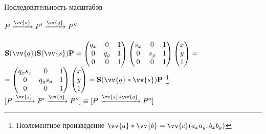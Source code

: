 \documentclass[10pt]{beamer}
\begin{document}
\begin{frame}{Последовательность масштабов}

	$	P \xrightarrow{\vv{s}} P' \xrightarrow{\vv{q}} P'' $ \\ ~ \\ \pause
	$	
	    \textbf{S}(\vv{q})\textbf{S}(\vv{s})\textbf{P}=
		\begin{pmatrix}
			q_x&0&1\\
			0&q_y&1\\
			0&0&1
		\end{pmatrix}
		\begin{pmatrix}
			s_x&0&1\\
			0&s_y&1\\
			0&0&1
		\end{pmatrix}
	    \begin{pmatrix}
			x\\
			y\\
			1
		\end{pmatrix}
		=
	$ \\[1em]  \pause
	\hspace{2cm} $   =
		\begin{pmatrix}
			q_xs_x&0&1\\
			0&q_ys_y&1\\
			0&0&1
		\end{pmatrix}
	    \begin{pmatrix}
			x\\
			y\\
			1
		\end{pmatrix}
		= \textbf{S}(\vv{q}*\vv{s})\textbf{P}
	$ \footnote{Поэлементное произведение $\vv{a}*\vv{b}=\vv{c}(a_xa_y,b_xb_y)$}\\[1em]
	
	
	
	$  [	P \xrightarrow{\vv{s}} P' \xrightarrow{\vv{q}} P'' ] \equiv [  P \xrightarrow{\vv{s}*\vv{q}} P''    ]   $
	

\end{frame}
\end{document}
